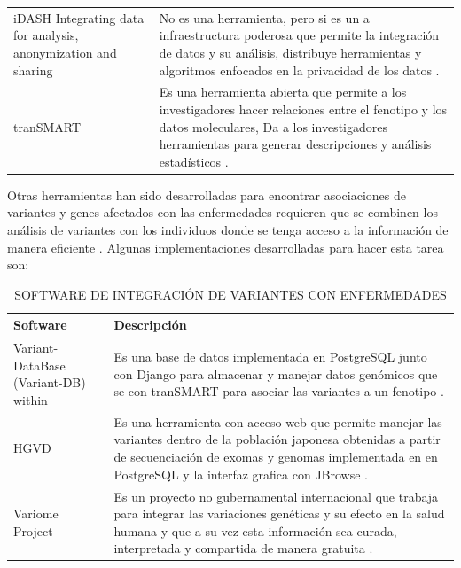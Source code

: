 {\begin{table}[]
\begin{tabular}{|p{5cm}|p{10cm}|}
		iDASH Integrating data for analysis, anonymization and sharing & No es una herramienta, pero si es un a infraestructura poderosa que permite la integración de datos y su análisis, distribuye herramientas y algoritmos enfocados en la privacidad de los datos \cite{Canuel2015}. \\ \cline{1-2}
		
		tranSMART & Es una herramienta abierta que permite a los investigadores hacer relaciones entre el fenotipo y los datos moleculares, Da a los investigadores herramientas para generar descripciones y análisis estadísticos \cite{Canuel2015}. \\ \hline		
		
	\end{tabular}
\end{table}

Otras herramientas han sido desarrolladas para encontrar asociaciones de variantes y genes afectados con las enfermedades requieren que se combinen los análisis de variantes con los individuos donde se tenga acceso a la información de manera eficiente \cite{Kutzera2017}. Algunas implementaciones desarrolladas para hacer esta tarea son:

\begin{table}[H]
	\centering
	\caption{SOFTWARE DE INTEGRACIÓN DE VARIANTES CON ENFERMEDADES}
	\label{r}
	\begin{tabular}{|p{5cm}|p{10cm}|}
		\hline
		Software     & Descripción                                                                                                                                                                                                                                                                                                                                                                                 \\ \hline
		Variant-DataBase (Variant-DB) within      & Es una base de datos implementada en PostgreSQL junto con Django para almacenar y manejar datos genómicos que se con tranSMART para asociar las variantes a un fenotipo \cite{Kutzera2017}.      \\ \cline{1-2}
		HGVD       & Es una herramienta con acceso web que permite manejar las variantes dentro de la población japonesa obtenidas a partir de secuenciación de exomas y genomas implementada en en PostgreSQL y la interfaz grafica con JBrowse \cite{Higasa2016}.       \\ \cline{1-2}
		Variome Project    &   Es un proyecto no gubernamental internacional que trabaja para integrar las variaciones genéticas y su efecto en la salud humana y que a su vez esta información sea curada, interpretada y compartida de manera gratuita \cite{variome2017}.                                                                                                                                                                                                              \\ \hline
	\end{tabular}
\end{table}

}
